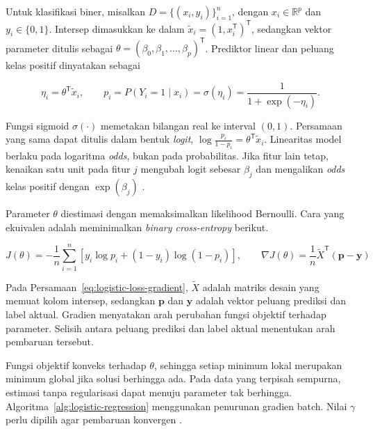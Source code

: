 Untuk klasifikasi biner, misalkan $D=\{(x_i,y_i)\}_{i=1}^{n}$, dengan $x_i\in\mathbb{R}^{p}$ dan $y_i\in\{0,1\}$. Intersep dimasukkan ke dalam $\tilde{x}_i=(1,x_i^{\mathsf{T}})^{\mathsf{T}}$, sedangkan vektor parameter ditulis sebagai $\theta=(\beta_0,\beta_1,\ldots,\beta_p)^{\mathsf{T}}$. Prediktor linear dan peluang kelas positif dinyatakan sebagai

\begin{equation}
    \eta_i=\theta^{\mathsf{T}}\tilde{x}_i,
    \qquad
    p_i=P(Y_i=1\mid x_i)=\sigma(\eta_i)=\frac{1}{1+\exp(-\eta_i)}.
    \label{eq:logistic-probability}
\end{equation}

Fungsi sigmoid $\sigma(\cdot)$ memetakan bilangan real ke interval $(0,1)$. Persamaan yang sama dapat ditulis dalam bentuk \textit{logit}, $\log\frac{p_i}{1-p_i}=\theta^{\mathsf{T}}\tilde{x}_i$. Linearitas model berlaku pada logaritma \textit{odds}, bukan pada probabilitas. Jika fitur lain tetap, kenaikan satu unit pada fitur $j$ mengubah logit sebesar $\beta_j$ dan mengalikan \textit{odds} kelas positif dengan $\exp(\beta_j)$ \cite{james2021islr}.

Parameter $\theta$ diestimasi dengan memaksimalkan likelihood Bernoulli. Cara yang ekuivalen adalah meminimalkan \textit{binary cross-entropy} berikut.

\begin{equation}
    J(\theta)=-\frac{1}{n}\sum_{i=1}^{n}\left[y_i\log p_i+(1-y_i)\log(1-p_i)\right],
    \qquad
    \nabla J(\theta)=\frac{1}{n}\widetilde{X}^{\mathsf{T}}(\mathbf{p}-\mathbf{y})
    \label{eq:logistic-loss-gradient}
\end{equation}

Pada Persamaan~\ref{eq:logistic-loss-gradient}, $\widetilde{X}$ adalah matriks desain yang memuat kolom intersep, sedangkan $\mathbf{p}$ dan $\mathbf{y}$ adalah vektor peluang prediksi dan label aktual. Gradien menyatakan arah perubahan fungsi objektif terhadap parameter. Selisih antara peluang prediksi dan label aktual menentukan arah pembaruan tersebut.

Fungsi objektif konveks terhadap $\theta$, sehingga setiap minimum lokal merupakan minimum global jika solusi berhingga ada. Pada data yang terpisah sempurna, estimasi tanpa regularisasi dapat menuju parameter tak berhingga. Algoritma~\ref{alg:logistic-regression} menggunakan penurunan gradien batch. Nilai $\gamma$ perlu dipilih agar pembaruan konvergen \cite{james2021islr}.

